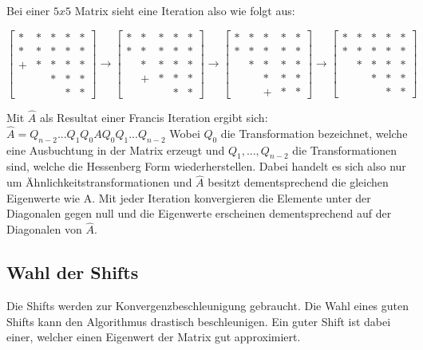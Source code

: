 Bei einer $5x5$ Matrix sieht eine Iteration also wie folgt aus:

\begin{equation}
	\begin{bmatrix}
	* & * & * & * & *  \\
	* & * & *  & * & *  \\
	+ & * & * & * & *\\
	&   & * & * & * \\
	&   &   & * & * 
	\end{bmatrix} \rightarrow
	\begin{bmatrix}
	* & * & * & * & *  \\
	* & * & *  & * & *  \\
	& * & * & * & *\\
	&  + & * & * & * \\
	&   &   & * & * 
	\end{bmatrix} \rightarrow
	\begin{bmatrix}
	* & * & * & * & *  \\
	* & * & *  & * & *  \\
	& * & * & * & *\\
	&   & * & * & * \\
	&   &  + & * & * 
	\end{bmatrix} \rightarrow
	\begin{bmatrix}
	* & * & * & * & *  \\
	* & * & *  & * & *  \\
	& * & * & * & *\\
	&   & * & * & * \\
	&   &   & * & * 
	\end{bmatrix}
\end{equation}

Mit $\hat{A}$ als Resultat einer Francis Iteration ergibt sich: $\hat{A}=Q_{n-2}...Q_{1}Q_{0}AQ_{0}Q_{1}...Q_{n-2}$
Wobei $Q_{0}$ die Transformation bezeichnet, welche eine Ausbuchtung in der Matrix erzeugt und $Q_{1},...,Q_{n-2}$ die Transformationen sind, welche die Hessenberg Form wiederherstellen.
Dabei handelt es sich also nur um Ähnlichkeitstransformationen und $\hat{A}$ besitzt dementsprechend die gleichen Eigenwerte wie A.
Mit jeder Iteration konvergieren die Elemente unter der Diagonalen gegen null und die Eigenwerte erscheinen dementsprechend auf der Diagonalen von $\hat{A}$.

\subsection{Wahl der Shifts\label{francis:section:francis_iteration:wahl_shift}}
Die Shifts werden zur Konvergenzbeschleunigung gebraucht.
Die Wahl eines guten Shifts kann den Algorithmus drastisch beschleunigen. 
Ein guter Shift ist dabei einer, welcher einen Eigenwert der Matrix gut approximiert.

